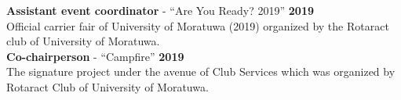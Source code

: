 \documentclass[legalpaper,11pt]{article}
\begin{document}
\textbf{Assistant event coordinator} - ``Are You Ready? 2019'' \hfill\textbf{2019}\\
Official carrier fair of University of Moratuwa (2019) organized by the Rotaract club of University of Moratuwa.\\

\textbf{Co-chairperson} - ``Campfire'' \hfill\textbf{2019}\\
The signature project under the avenue of Club Services which was organized by Rotaract Club of University of Moratuwa.

\setlength{\leftskip}{0pt}
\vspace{2cm}

\end{document}
